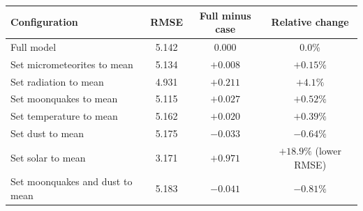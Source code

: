 \begin{center}
\centering
\begin{tabular}{@{}lccc@{}}
\toprule
Configuration & RMSE & Full minus case & Relative change \\
\midrule
Full model & 5.142 & 0.000 & 0.0\% \\
Set micrometeorites to mean & 5.134 & $+0.008$ & $+0.15\%$ \\
Set radiation to mean & 4.931 & $+0.211$ & $+4.1\%$ \\
Set moonquakes to mean & 5.115 & $+0.027$ & $+0.52\%$ \\
Set temperature to mean & 5.162 & $+0.020$ & $+0.39\%$ \\
Set dust to mean & 5.175 & $-0.033$ & $-0.64\%$ \\
Set solar to mean & 3.171 & $+0.971$ & $+18.9\%$ (lower RMSE) \\
Set moonquakes and dust to mean & 5.183 & $-0.041$ & $-0.81\%$ \\
\bottomrule
\end{tabular}
\label{tab:ablation-solar}
\end{center}
